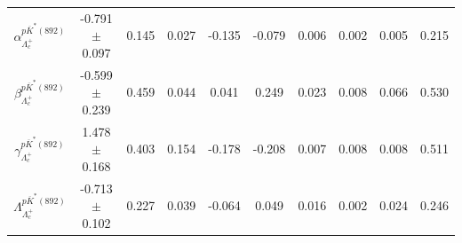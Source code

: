 \begin{table}[H]
{\begin{tabular}{c|c|ccccccc|c}
$\alpha_{\Lambda_c^+}^{p\overline{K}^*(892)}$ & -0.791$\pm$0.097 & 0.145 & 0.027 & -0.135 & -0.079 & 0.006 & 0.002 & 0.005 & 0.215\\
$\beta_{\Lambda_c^+}^{p\overline{K}^*(892)}$ & -0.599$\pm$0.239 & 0.459 & 0.044 & 0.041 & 0.249 & 0.023 & 0.008 & 0.066 & 0.530\\
$\gamma_{\Lambda_c^+}^{p\overline{K}^*(892)}$ & 1.478$\pm$0.168 & 0.403 & 0.154 & -0.178 & -0.208 & 0.007 & 0.008 & 0.008 & 0.511\\
$\Lambda_{\Lambda_c^+}^{p\overline{K}^*(892)}$ & -0.713$\pm$0.102 & 0.227 & 0.039 & -0.064 & 0.049 & 0.016 & 0.002 & 0.024 & 0.246\\
\hline\hline
\end{tabular}
}

\end{table}

